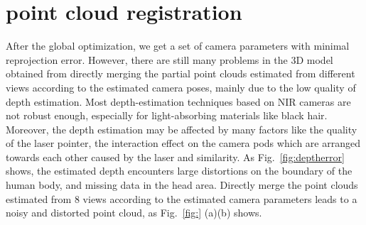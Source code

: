 
\section{point cloud registration}
\label{sec:registration}

 
After the global optimization, we get a set of camera parameters with minimal reprojection error. 
However, there are still many problems in the 3D model obtained from directly merging the partial point clouds estimated from different views according to the estimated camera poses, mainly due to the low quality of depth estimation. 
%
Most depth-estimation techniques based on NIR cameras are not robust enough, especially for light-absorbing materials like black hair. 
Moreover, the depth estimation may be affected by many factors like the quality of the laser pointer, the interaction effect on the camera pods which are arranged towards each other caused by the laser and similarity. 
As Fig.~\ref{fig:deptherror} shows, the estimated depth encounters large distortions on the boundary of the human body, and missing data in the head area.
Directly merge the point clouds estimated from 8 views according to the estimated camera parameters leads to a noisy and distorted point cloud, as Fig.~\ref{fig:} (a)(b) shows. 


